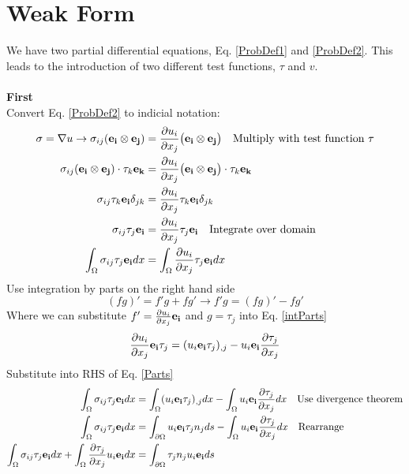 \documentclass[12pt,3p]{article}
\begin{document}
\section{Weak Form}
We have two partial differential equations, Eq. \ref{ProbDef1} and \ref{ProbDef2}. This leads to the introduction of two different test functions, $\tau$ and $v$. \\ \\
\textbf{First} \\
Convert Eq. \ref{ProbDef2} to indicial notation: 
\begin{align}\label{Parts}
\begin{split}
\sigma = \nabla u \rightarrow \sigma_{ij} (\mathbf{e_i} \otimes \mathbf{e_j}) &= \pdv{u_i}{x_j} \big( \mathbf{e_i} \otimes \mathbf{e_j} \big) \quad \text{Multiply with test function } \tau \\
\sigma_{ij} (\mathbf{e_i} \otimes \mathbf{e_j}) \cdot \tau_k \mathbf{e_k} &= \pdv{u_i}{x_j} \big( \mathbf{e_i} \otimes \mathbf{e_j} \big) \cdot \tau_k \mathbf{e_k} \\
\sigma_{ij} \tau_k \mathbf{e_i} \delta_{jk} &= \pdv{u_i}{x_j} \tau_k \mathbf{e_i} \delta_{jk} \\
\sigma_{ij} \tau_j \mathbf{e_i} &= \pdv{u_i}{x_j} \tau_j \mathbf{e_i} \quad \text{Integrate over domain} \\
\int_{\Omega} \sigma_{ij} \tau_j \mathbf{e_i} dx &= \int_{\Omega} \pdv{u_i}{x_j} \tau_j \mathbf{e_i} dx
\end{split}
\end{align}
Use integration by parts on the right hand side 
\begin{equation}\label{intParts}
(fg)' = f'g + fg' \rightarrow f'g = (fg)' - fg'
\end{equation}
Where we can substitute $f' = \pdv{u_i}{x_j} \mathbf{e_i} $ and $g = \tau_j$ into Eq. \ref{intParts}
\begin{equation*}
\pdv{u_i}{x_j} \mathbf{e_i} \tau_j = (u_i \mathbf{e_i} \tau_j)_{,j} - u_i \mathbf{e_i} \pdv{\tau_j}{x_j}
\end{equation*}
Substitute into RHS of Eq. \ref{Parts}
\begin{align*}
\int_{\Omega} \sigma_{ij} \tau_j \mathbf{e_i} dx &= \int_{\Omega} (u_i \mathbf{e_i} \tau_j)_{,j} dx - \int_{\Omega} u_i \mathbf{e_i} \pdv{\tau_j}{x_j} dx \quad \text{Use divergence theorem} \\
\int_{\Omega} \sigma_{ij} \tau_j \mathbf{e_i} dx &= \int_{\partial \Omega} u_i \mathbf{e_i} \tau_j n_j ds - \int_{\Omega} u_i \mathbf{e_i} \pdv{\tau_j}{x_j} dx \quad \text{Rearrange} \\
\int_{\Omega} \sigma_{ij} \tau_j \mathbf{e_i} dx + \int_{\Omega} \pdv{\tau_j}{x_j} u_i \mathbf{e_i} dx &= \int_{\partial \Omega} \tau_j n_j u_i \mathbf{e_i} ds 
\end{align*}
\end{document}
